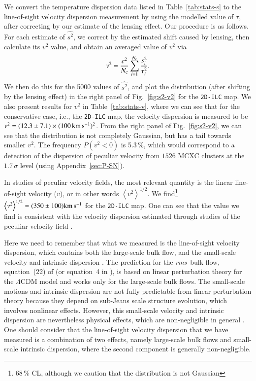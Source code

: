 \documentclass[traditabstract, longauth]{aa}
\newcommand{\1}{\'\i }
\def \kms{{\rm km\,s^{-1}}}
\def \rms{{\it rms}}
\begin{document}
We convert the temperature dispersion data listed in Table~\ref{tab:stats-s} to the line-of-sight velocity dispersion measurement by using the modelled value of $\tau$, after correcting by our estimate of the lensing effect.
Our procedure is as follows. For each estimate of $\widehat{s^{2}}$, we correct
by the estimated shift caused by lensing, then calculate its $v^{2}$ value, and obtain an averaged value of $v^{2}$ via
\begin{eqnarray}
v^{2}=\frac{c^{2}}{N_{\rm c}} \sum^{N_{\rm c}}_{i=1} \frac{s^{2}_{i}}{\tau^{2}_{i}}. \label{eq:v-2}
\end{eqnarray}
We then do this for the 5000 values of $\widehat{s^{2}}$, and plot the distribution (after shifting by the lensing effect) in the right panel of Fig.~\ref{fig:s2-v2} for the {\tt 2D-ILC} map. We also present results for $v^{2}$ in Table~\ref{tab:stats-v}, where we can see
that for the conservative case, i.e., the {\tt 2D-ILC} map, the velocity
dispersion is measured to be
$v^{2}=(12.3\pm 7.1)\times
(100\,\kms)^{2}$. From the right panel of Fig.~\ref{fig:s2-v2}, we can see that
the distribution is not completely Gaussian, but has a tail towards smaller
$v^{2}$. The frequency $P(v^{2}<0)$ is 5.3\,\%, which would correspond to a
detection of the dispersion of peculiar velocity from $1526$ MCXC clusters at
the $1.7\,\sigma$ level (using Appendix~\ref{sec:P-SN}).

In studies of peculiar velocity fields, the most
relevant quantity is the linear line-of-sight velocity ($v$), or in other
words $\left\langle v^2\right\rangle^{1/2}$. We find\footnote{68\,\% CL,
although we caution that the distribution is not Gaussian}
$\left\langle v^2\right\rangle^{1/2}=(350 \pm 100)\kms$ for the {\tt 2D-ILC}
map.  One can see that the value we find
is consistent with the velocity dispersion
estimated through studies of the peculiar velocity field
\citep[e.g.,][]{Riess00,Turnbull12,mascott12,Carrick15}.

Here we need to remember that what we measured is the line-of-sight
velocity dispersion, which contains both the large-scale bulk flow, and the
small-scale velocity and intrinsic dispersion \citep[see, e.g.,][]{mascott14}.
The prediction for the \rms\ bulk flow, equation~(22) of \cite{planck2013-XIII}
(or equation~4 in \citealt{MaPan14}), is based on linear perturbation theory
for the $\Lambda$CDM model and works only for the large-scale bulk flows.
The small-scale motions and intrinsic dispersion are not fully predictable
from linear perturbation theory
because they depend on sub-Jeans scale structure evolution, which involves
nonlinear effects. However, this small-scale velocity and intrinsic dispersion
are nevertheless physical effects, which are non-negligible in
general \citep{Carrick15}. One should consider that
the line-of-sight velocity dispersion that we have measured is a
combination of two effects, namely large-scale bulk flows and small-scale intrinsic
dispersion, where the second component is generally non-negligible.
\end{document}
